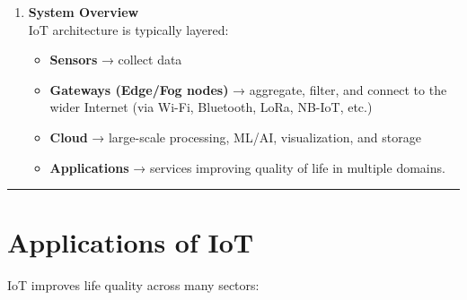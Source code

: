 \documentclass[a4paper, 12pt]{book} %
\begin{document}
\begin{enumerate}
\begin{itemize}
    \begin{itemize}
    \item
      Direct (automatic actuation, e.g., switch on AC if temperature
      \textgreater{} threshold),
    \item
      Indirect (recommendations to operators, process optimization).
    \end{itemize}
  \item
    IoT also helps identify anomalies and trigger corrective actions.
  \end{itemize}
\item
  \textbf{System Overview}\\
  IoT architecture is typically layered:

  \begin{itemize}
  \item
    \textbf{Sensors} → collect data
  \item
    \textbf{Gateways (Edge/Fog nodes)} → aggregate, filter, and connect
    to the wider Internet (via Wi-Fi, Bluetooth, LoRa, NB-IoT, etc.)
  \item
    \textbf{Cloud} → large-scale processing, ML/AI, visualization, and
    storage
  \item
    \textbf{Applications} → services improving quality of life in
    multiple domains.
  \end{itemize}
\end{enumerate}

\begin{center}\rule{0.5\linewidth}{0.5pt}\end{center}

\section{Applications of IoT}\label{applications-of-iot}

IoT improves life quality across many sectors:
\end{document}
